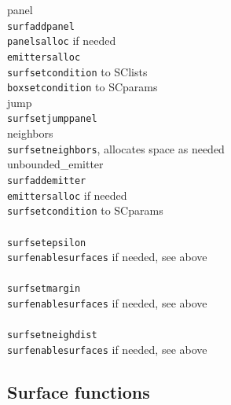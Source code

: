 \documentclass {scrbook}
\newcommand {\ttt} {\texttt}
\begin{document}
\begin{tabbing}
\>panel\\
\>\>\ttt{surfaddpanel}\\
\>\>\>\ttt{panelsalloc} if needed\\
\>\>\>\>\ttt{emittersalloc}\\
\>\>\>\ttt{surfsetcondition} to SClists\\
\>\>\>\ttt{boxsetcondition} to SCparams\\
\>jump\\
\>\>\ttt{surfsetjumppanel}\\
\>neighbors\\
\>\>\ttt{surfsetneighbors}, allocates space as needed\\
\>unbounded\_emitter\\
\>\>\ttt{surfaddemitter}\\
\>\>\>\ttt{emittersalloc} if needed\\
\>\>\>\ttt{surfsetcondition} to SCparams\\
\newline \\
\ttt{surfsetepsilon}\\
\>\ttt{surfenablesurfaces} if needed, see above\\
\newline \\
\ttt{surfsetmargin}\\
\>\ttt{surfenablesurfaces} if needed, see above\\
\newline \\
\ttt{surfsetneighdist}\\
\>\ttt{surfenablesurfaces} if needed, see above\\
\end{tabbing}


\subsection{Surface functions}
\end{document}
